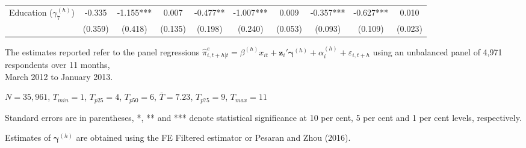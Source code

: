 \begin{table}[!h]
\begin{threeparttable}
\begin{tabular}{|l|ccc|ccc|ccc|}
Education ($\gamma^{(h)}_7$) & -0.335 & -1.155*** & 0.007 & -0.477** & -1.007*** & 0.009 & -0.357*** & -0.627*** & 0.010 \\ 
 & (0.359) & (0.418) & (0.135)& (0.198) & (0.240) & (0.053)& (0.093) & (0.109) & (0.023) \\ \bottomrule
\end{tabular} 
\begin{tablenotes} 
\item The  estimates reported refer to the panel regressions  $\hat{\pi}^e_{i,t+h|t}=\beta^{(h)} x_{i t}+\mathbf{z}_{i}\prime\mathbf{\gamma }^{(h)}+\alpha_i^{(h)}+\varepsilon_{i,t+h}$  using an unbalanced panel of 4,971 respondents over 11 months,\\  March 2012 to January 2013.
\item $N=35,961$, $T_{min}=1$, $T_{p25}=4$, $T_{p50}=6$, $\bar{T}=7.23$, $T_{p75}=9$,    $T_{max}=11$
\item Standard errors are in parentheses, *, ** and *** denote statistical significance at 10 per cent, 5 per cent and 1 per cent levels, respectively. 
\item Estimates of $\mathbf{\gamma}^{(h)}$ are obtained using the  FE Filtered estimator or Pesaran and Zhou (2016). 
  \end{tablenotes} 
\end{threeparttable} 
\end{table} 
